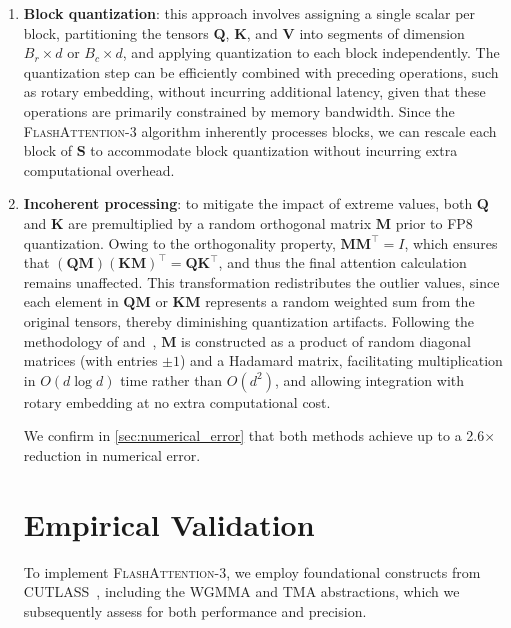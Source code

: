 \begin{enumerate}

\item \textbf{Block quantization}: this approach involves assigning a single scalar per block, partitioning the tensors $\mathbf{Q}$, $\mathbf{K}$, and $\mathbf{V}$ into segments of dimension $B_r \times d$ or $B_c \times d$, and applying quantization to each block independently. The quantization step can be efficiently combined with preceding operations, such as rotary embedding, without incurring additional latency, given that these operations are primarily constrained by memory bandwidth. Since the \textsc{FlashAttention-3} algorithm inherently processes blocks, we can rescale each block of $\mathbf{S}$ to accommodate block quantization without incurring extra computational overhead.

\item \textbf{Incoherent processing}: to mitigate the impact of extreme values, both $\mathbf{Q}$ and $\mathbf{K}$ are premultiplied by a random orthogonal matrix $\mathbf{M}$ prior to FP8 quantization. Owing to the orthogonality property, $\mathbf{M} \mathbf{M}^\top = I$, which ensures that $(\mathbf{Q} \mathbf{M}) (\mathbf{K} \mathbf{M})^\top = \mathbf{Q} \mathbf{K}^\top$, and thus the final attention calculation remains unaffected. This transformation redistributes the outlier values, since each element in $\mathbf{Q} \mathbf{M}$ or $\mathbf{K} \mathbf{M}$ represents a random weighted sum from the original tensors, thereby diminishing quantization artifacts. Following the methodology of \citet{chee2024quip} and~\citet{tseng2024quip}, $\mathbf{M}$ is constructed as a product of random diagonal matrices (with entries $\pm 1$) and a Hadamard matrix, facilitating multiplication in $O(d \log d)$ time rather than $O(d^2)$, and allowing integration with rotary embedding at no extra computational cost.

We confirm in \cref{sec:numerical_error} that both methods achieve up to a 2.6$\times$ reduction in numerical error.

\section{Empirical Validation}
\label{sec:exp}

To implement \textsc{FlashAttention-3}, we employ foundational constructs from CUTLASS~\citep{Thakkar_CUTLASS_2023}, including the WGMMA and TMA abstractions, which we subsequently assess for both performance and precision.


\end{enumerate}
